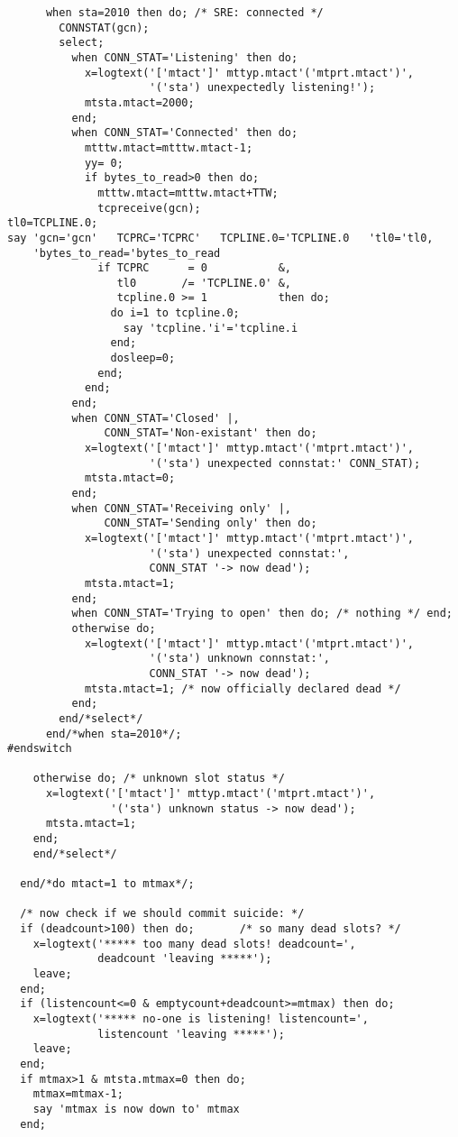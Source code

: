 \begin{verbatim}
      when sta=2010 then do; /* SRE: connected */
        CONNSTAT(gcn);
        select;
          when CONN_STAT='Listening' then do;
            x=logtext('['mtact']' mttyp.mtact'('mtprt.mtact')',
                      '('sta') unexpectedly listening!');
            mtsta.mtact=2000;
          end;
          when CONN_STAT='Connected' then do;
            mtttw.mtact=mtttw.mtact-1;
            yy= 0;
            if bytes_to_read>0 then do;
              mtttw.mtact=mtttw.mtact+TTW;
              tcpreceive(gcn);
tl0=TCPLINE.0;
say 'gcn='gcn'   TCPRC='TCPRC'   TCPLINE.0='TCPLINE.0   'tl0='tl0,
    'bytes_to_read='bytes_to_read
              if TCPRC      = 0           &,
                 tl0       /= 'TCPLINE.0' &,
                 tcpline.0 >= 1           then do;
                do i=1 to tcpline.0;
                  say 'tcpline.'i'='tcpline.i
                end;
                dosleep=0;
              end;
            end;
          end;
          when CONN_STAT='Closed' |,
               CONN_STAT='Non-existant' then do;
            x=logtext('['mtact']' mttyp.mtact'('mtprt.mtact')',
                      '('sta') unexpected connstat:' CONN_STAT);
            mtsta.mtact=0;
          end;
          when CONN_STAT='Receiving only' |,
               CONN_STAT='Sending only' then do;
            x=logtext('['mtact']' mttyp.mtact'('mtprt.mtact')',
                      '('sta') unexpected connstat:',
                      CONN_STAT '-> now dead');
            mtsta.mtact=1;
          end;
          when CONN_STAT='Trying to open' then do; /* nothing */ end;
          otherwise do;
            x=logtext('['mtact']' mttyp.mtact'('mtprt.mtact')',
                      '('sta') unknown connstat:',
                      CONN_STAT '-> now dead');
            mtsta.mtact=1; /* now officially declared dead */
          end;
        end/*select*/
      end/*when sta=2010*/;
#endswitch

    otherwise do; /* unknown slot status */
      x=logtext('['mtact']' mttyp.mtact'('mtprt.mtact')',
                '('sta') unknown status -> now dead');
      mtsta.mtact=1;
    end;
    end/*select*/

  end/*do mtact=1 to mtmax*/;

  /* now check if we should commit suicide: */
  if (deadcount>100) then do;       /* so many dead slots? */
    x=logtext('***** too many dead slots! deadcount=',
              deadcount 'leaving *****');
    leave;
  end;
  if (listencount<=0 & emptycount+deadcount>=mtmax) then do;
    x=logtext('***** no-one is listening! listencount=',
              listencount 'leaving *****');
    leave;
  end;
  if mtmax>1 & mtsta.mtmax=0 then do;
    mtmax=mtmax-1;
    say 'mtmax is now down to' mtmax
  end;


\end{verbatim}
